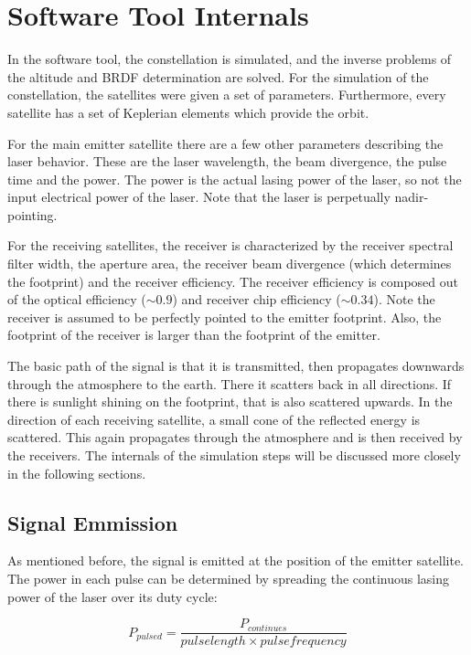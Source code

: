 \section{Software Tool Internals}
\label{SoftwareToolInternals}

In the software tool, the constellation is simulated, and the inverse problems of the altitude and BRDF determination are solved. For the simulation of the constellation, the satellites were given a set of parameters. Furthermore, every satellite has a set of Keplerian elements which provide the orbit. 

For the main emitter satellite there are a few other parameters describing the laser behavior. These are the laser wavelength, the beam divergence, the pulse time and the power. The power is the actual lasing power of the laser, so not the input electrical power of the laser. Note that the laser is perpetually nadir-pointing.

For the receiving satellites, the receiver is characterized by the receiver spectral filter width, the aperture area, the receiver beam divergence (which determines the footprint) and the receiver efficiency. The receiver efficiency is composed out of the optical efficiency ($\sim0.9$) and receiver chip efficiency ($\sim0.34$). Note the receiver is assumed to be perfectly pointed to the emitter footprint. Also, the footprint of the receiver is larger than the footprint of the emitter.

The basic path of the signal is that it is transmitted, then propagates downwards through the atmosphere to the earth. There it scatters back in all directions. If there is sunlight shining on the footprint, that is also scattered upwards. In the direction of each receiving satellite, a small cone of the reflected energy is scattered. This again propagates through the atmosphere and is then received by the receivers. The internals of the simulation steps will be discussed more closely in the following sections.


\subsection{Signal Emmission}
As mentioned before, the signal is emitted at the position of the emitter satellite. The power in each pulse can be determined by spreading the continuous lasing power of the laser over its duty cycle:

\begin{equation}
	P_{pulsed} =  \frac{P_{continues}}{pulse length \times pulse frequency}
\end{equation}

